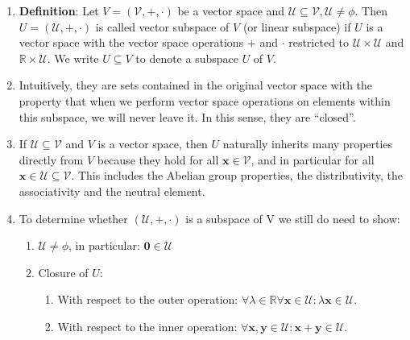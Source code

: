 \begin{enumerate}
    \item \textbf{Definition}: Let $V = (\mathcal{V}, +, \cdot )$ be a vector space and $\mathcal{U} \subseteq \mathcal{V}, \mathcal{U} \neq \phi$. 
    Then $U = (\mathcal{U}, +, \cdot )$ is called vector subspace of $V$ (or linear subspace) if $U$ is a vector space with the vector space operations $+$ and $\cdot$  restricted to $\mathcal{U} \times \mathcal{U}$ and $\mathbb{R} \times \mathcal{U}$. 
    We write $U \subseteq V$ to denote a subspace $U$ of $V$.
    \hfill \cite{mfml/book/mml/Deisenroth-Faisal-Ong}

    \item Intuitively, they are sets contained in the original vector space with the property that when we perform vector space operations on elements within this subspace, we will never leave it. 
    In this sense, they are “closed”.
    \hfill \cite{mfml/book/mml/Deisenroth-Faisal-Ong}

    \item If $\mathcal{U} \subseteq \mathcal{V}$ and $V$ is a vector space, then $U$ naturally inherits many properties directly from $V$ because they hold for all $\bm{x} \in \mathcal{V}$, and in particular for all $\bm{x} \in \mathcal{U} \subseteq \mathcal{V}$. 
    This includes the Abelian group properties, the distributivity, the associativity and the neutral element.
    \hfill \cite{mfml/book/mml/Deisenroth-Faisal-Ong}

    \item To determine whether $(\mathcal{U}, +, \cdot)$ is a subspace of V we still do need to show:
    \begin{enumerate}
        \item $\mathcal{U} \neq \phi$, in particular: $\bm{0} \in \mathcal{U}$
        \hfill \cite{mfml/book/mml/Deisenroth-Faisal-Ong}

        \item Closure of $U$:
        \begin{enumerate}
            \item With respect to the outer operation: $\forall \lambda  \in  \mathbb{R} \forall \bm{x} \in  \mathcal{U} : \lambda \bm{x} \in  \mathcal{U}$.
            \hfill \cite{mfml/book/mml/Deisenroth-Faisal-Ong}
            
            \item With respect to the inner operation: $\forall \bm{x}, \bm{y} \in  \mathcal{U} : \bm{x} + \bm{y} \in  \mathcal{U}$.
            \hfill \cite{mfml/book/mml/Deisenroth-Faisal-Ong}
        \end{enumerate}
    \end{enumerate}

\end{enumerate}



